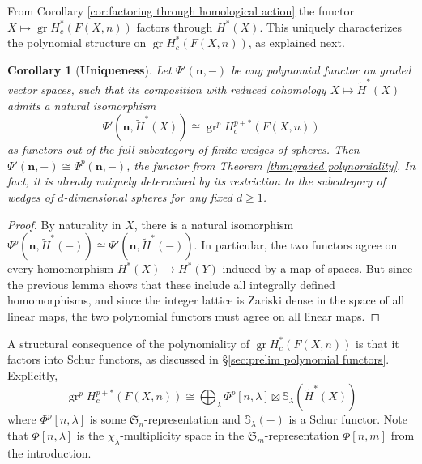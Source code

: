 \documentclass[12pt]{article}
\newcommand{\SymGroup}[1][n]{\mathfrak{S}_{#1}}
\newcommand{\Specht}[1]{\chi_{#1}}
\newcommand{\Schur}[1]{\mathbb{S}_{#1}}
\newcommand{\n}[1][n]{\mathbf{#1}}
\DeclareMathOperator{\gr}{gr}
\theoremstyle{plain}
\newtheorem{cor}[thm]{Corollary}
\theoremstyle{definition}
\theoremstyle{remark}
\begin{document}
From Corollary \ref{cor:factoring through homological action} the functor $X\mapsto \gr H^*_c(F(X,n))$ factors through $H^*(X)$. This uniquely characterizes the polynomial structure on $\gr H^*_c(F(X,n))$, as explained next.

\begin{cor}[\textbf{Uniqueness}]
Let $\Psi'(\n,-)$ be any polynomial functor on graded vector spaces, such that its composition with reduced cohomology $X\mapsto \tilde{H}^*(X)$ admits a natural isomorphism
\[
\Psi'(\n,\tilde{H}^*(X)) \cong \gr^p H^{p+*}_c(F(X,n))
\]
as functors out of the full subcategory of finite wedges of spheres.  Then $\Psi'(\n,-)\cong \Psi^p(\n,-)$, the functor from Theorem \ref{thm:graded polynomiality}. In fact, it is already uniquely determined by its restriction to the subcategory of wedges of $d$-dimensional spheres for any fixed $d\geq 1$.


\end{cor}
\begin{proof}
    By naturality in $X$, there is a natural isomorphism $\Psi^p(\n,\tilde{H}^*(-))\cong \Psi'(\n,\tilde{H}^*(-))$. In particular, the two functors agree on every homomorphism $H^*(X)\to H^*(Y)$ induced by a map of spaces. But since the previous lemma shows that these include all integrally defined homomorphisms, and since the integer lattice is Zariski dense in the space of all linear maps, the two polynomial functors must agree on all linear maps.
\end{proof}

A structural consequence of the polynomiality of $\gr H^*_c(F(X,n))$ is that it factors into Schur functors, as discussed in \S\ref{sec:prelim polynomial functors}. Explicitly,
\begin{equation}\label{eq:schur decomposition}
    \gr^p H^{p+*}_c(F(X,n)) \cong \bigoplus_{\lambda} \Phi^p[n,\lambda]\boxtimes \Schur{\lambda}\left( \tilde{H}^*(X) \right)
\end{equation}
where $\Phi^p[n,\lambda]$ is some $\SymGroup$-representation and $\Schur{\lambda}(-)$ is a Schur functor. Note that $\Phi[n,\lambda]$ is the $\Specht{\lambda}$-multiplicity space in the $\SymGroup[m]$-representation $\Phi[n,m]$ from the introduction.
\end{document}
